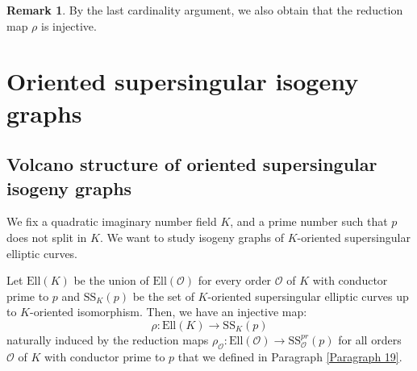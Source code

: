 \documentclass[a4paper,10pt,notitlepage]{report}
\theoremstyle{definition}
\theoremstyle{plain}
\theoremstyle{definition}
\newtheorem{Remark}[Definition]{Remark}
\newcommand{\N}{\mathbb{N}}
\newcommand{\Z}{\mathbb{Z}}
\newcommand{\C}{\mathbb{C}}
\newcommand{\mO}{\mathcal{O}}
\renewcommand{\(}{\left(}
\renewcommand{\)}{\right)}
\newcommand{\mf}[1]{\mathfrak{#1}}
\let\SS\relax
\DeclareMathOperator{\SS}{SS}
\DeclareMathOperator{\Ell}{Ell}
\begin{document}
\begin{Remark}\label{Remark 1}
By the last cardinality argument, we also obtain that the reduction map $\rho$ is injective.
\end{Remark}

\section{Oriented supersingular isogeny graphs}

\subsection{Volcano structure of oriented supersingular isogeny graphs} 

We fix a quadratic imaginary number field $K$, and a prime number such that $p$ does not split in $K$.  We want to study isogeny graphs of $K$-oriented supersingular elliptic curves. 


Let $\mbox{Ell}(K)$ be the union of $\mbox{Ell}(\mO)$ for every order $\mO$ of $K$ with conductor prime to $p$ and $\mbox{SS}_K(p)$ be the set of $K$-oriented supersingular elliptic curves up to $K$-oriented isomorphism.  Then, we have an injective map: 
\[\rho:\mbox{Ell}(K)\longrightarrow \mbox{SS}_K(p)\] 
naturally induced by the reduction maps $\rho_{\mO}:\mbox{Ell}(\mO)\longrightarrow \mbox{SS}_{\mO}^{pr}(p)$ for all orders $\mO$ of $K$ with conductor prime to $p$ that we defined in Paragraph \ref{Paragraph 19}. 
\end{document}
